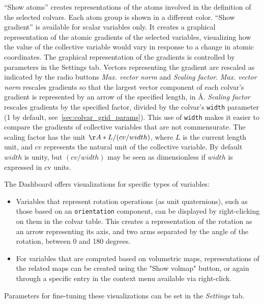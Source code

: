 {``Show atoms'' creates representations of the atoms involved in the definition of the selected colvars.
Each atom group is shown in a different color.
``Show gradient'' is available for scalar variables only.
It creates a graphical representation of the atomic gradients of the selected variables, visualizing how the value of the collective variable would vary in response to a change in atomic coordinates.
The graphical representation of the gradients is controlled by parameters in the Settings tab.
Vectors representing the gradient are rescaled as indicated by the radio buttons \emph{Max. vector norm} and \emph{Scaling factor}.
\emph{Max. vector norm} rescales gradients so that the largest vector component of each colvar's gradient is represented by an arrow of the specified length, in \AA.
\emph{Scaling factor} rescales gradients by the specified factor, divided by the colvar's \texttt{width} parameter (1 by default, see~\ref{sec:colvar_grid_params}).
This use of \texttt{width} makes it easier to compare the gradients of collective variables that are not commensurate.
The scaling factor has the unit $\AA * L / (cv / width)$, where $L$ is the current length unit, and $cv$ represents the natural unit of the collective variable.
By default $width$ is unity, but $(cv / width)$ may be seen as dimensionless if $width$ is expressed in cv units.

The Dashboard offers visualizations for specific types of variables:
\begin{itemize}
  \item Variables that represent rotation operations (as unit quaternions), such as those based on an \texttt{orientation} component, can be displayed by right-clicking on them in the colvar table.
  This creates a representation of the rotation as an arrow representing its axis, and two arms separated by the angle of the rotation, between 0 and 180 degrees.
  \item For variables that are computed based on volumetric maps, representations of the related maps can be created using the "Show volmap" button, or again through a specific entry in the context menu available via right-click.
\end{itemize}
Parameters for fine-tuning these visualizations can be set in the \textit{Settings} tab.



}

